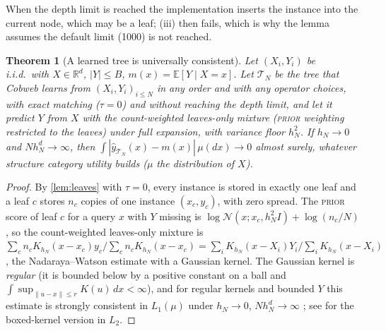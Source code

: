 \documentclass[11pt]{article}
\newtheorem{theorem}{Theorem}
\theoremstyle{definition}
\theoremstyle{remark}
\newcommand{\R}{\mathbb{R}}
\newcommand{\E}{\mathbb{E}}
\newcommand{\N}{\mathcal{N}}
\newcommand{\T}{\mathcal{T}}
\newcommand{\hy}{\hat{y}}
\begin{document}
When the depth limit is reached the implementation inserts the instance into the
current node, which may be a leaf; (iii) then fails, which is why the lemma assumes the
default limit (1000) is not reached.

\begin{theorem}[A learned tree is universally consistent]\label{thm:consistency}
Let $(X_i,Y_i)$ be i.i.d.\ with $X\in\R^d$, $|Y|\le B$, $m(x)=\E[Y\mid X=x]$.
Let $\T_N$ be the tree that Cobweb learns from $(X_i,Y_i)_{i\le N}$ in any order and with
any operator choices, with exact matching ($\tau=0$) and without reaching the depth
limit, and let it predict $Y$ from $X$ with the \emph{count-weighted} leaves-only mixture
(\textsc{prior} weighting restricted to the leaves) under full expansion, with variance
floor $h_N^2$.  If $h_N\to0$ and $Nh_N^d\to\infty$, then
$\int|\hy_{\T_N}(x)-m(x)|\,\mu(dx)\to0$ almost surely, whatever structure category
utility builds ($\mu$ the distribution of $X$).
\end{theorem}
\begin{proof}
By \cref{lem:leaves} with $\tau=0$, every instance is stored in exactly one leaf and a
leaf $c$ stores $n_c$ copies of one instance $(x_c,y_c)$, with zero spread.  The
\textsc{prior} score of leaf $c$ for a query $x$ with $Y$ missing is
$\log\N(x;x_c,h_N^2I)+\log(n_c/N)$, so the count-weighted leaves-only mixture is
$\sum_cn_cK_{h_N}(x-x_c)y_c/\sum_cn_cK_{h_N}(x-x_c)=\sum_iK_{h_N}(x-X_i)Y_i/\sum_iK_{h_N}(x-X_i)$,
the Nadaraya--Watson estimate with a Gaussian kernel.  The Gaussian kernel is \emph{regular} (it is bounded below by a
positive constant on a ball and $\int\sup_{\|u-x\|\le r}K(u)\,dx<\infty$), and for
regular kernels and bounded $Y$ this estimate is strongly consistent in $L_1(\mu)$
under $h_N\to0$, $Nh_N^d\to\infty$ \citep{devroye1989}; see \citet[Ch.~5]{gyorfi2002}
for the boxed-kernel version in $L_2$.
\end{proof}
\end{document}
